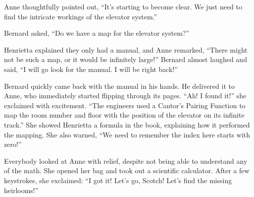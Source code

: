 Anne thoughtfully pointed out, ``It's starting to become clear. We just need to find the intricate workings of the elevator system.''

Bernard asked, ``Do we have a map for the elevator system?''

Henrietta explained they only had a manual, and Anne remarked, ``There might not be such a map, or it would be infinitely large!'' Bernard almost laughed and said, ``I will go look for the manual. I will be right back!''

Bernard quickly came back with the manual in his hands. He delivered it to Anne, who immediately started flipping through its pages. ``Ah! I found it!'' she exclaimed with excitement. ``The engineers used a Cantor's Pairing Function to map the room number and floor with the position of the elevator on its infinite track.'' 
She showed Henrietta a formula in the book, explaining how it performed the mapping. %
She also warned, ``We need to remember the index here starts with zero!''

Everybody looked at Anne with relief, despite not being able to understand any of the math. She opened her bag and took out a scientific calculator. After a few keystrokes, she exclaimed: ``I got it! Let's go, Scotch! Let's find the missing heirlooms!''
